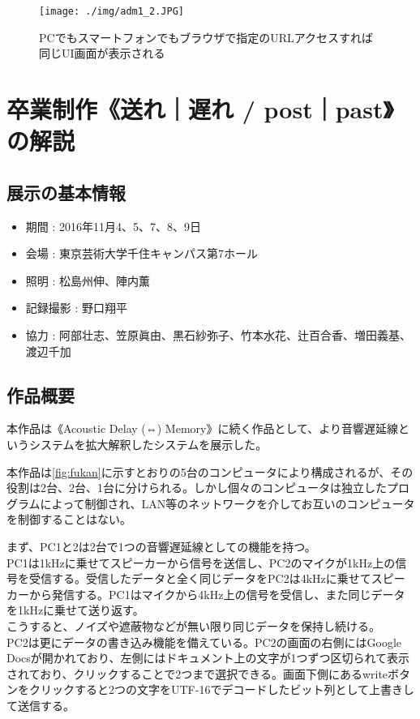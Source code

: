 \documentclass[a4paper,report]{jsbook}
\begin{document}
\begin{no-prefix-figure-caption}

\begin{figure}[htbp]
\centering
\texttt{[image: ./img/adm1\_2.JPG]}
\caption{PCでもスマートフォンでもブラウザで指定のURLアクセスすれば同じUI画面が表示される}
\end{figure}

\end{no-prefix-figure-caption}

\section{卒業制作《送れ｜遅れ /
post｜past》の解説}\label{ux5352ux696dux5236ux4f5cux9001ux308cux9045ux308c-postpastux306eux89e3ux8aac}

\subsection{展示の基本情報}\label{ux5c55ux793aux306eux57faux672cux60c5ux5831-1}

\begin{itemize}
\tightlist
\item
  期間 : 2016年11月4、5、7、8、9日
\item
  会場 : 東京芸術大学千住キャンパス第7ホール
\item
  照明 : 松島州伸、陣内薫
\item
  記録撮影 : 野口翔平
\item
  協力 :
  阿部壮志、笠原眞由、黒石紗弥子、竹本水花、辻百合香、増田義基、渡辺千加
\end{itemize}

\subsection{作品概要}\label{ux4f5cux54c1ux6982ux8981-2}

本作品は《Acoustic Delay (⇔)
Memory》に続く作品として、より音響遅延線というシステムを拡大解釈したシステムを展示した。

本作品は\cref{fig:fukan}に示すとおりの5台のコンピュータにより構成されるが、その役割は2台、2台、1台に分けられる。しかし個々のコンピュータは独立したプログラムによって制御され、LAN等のネットワークを介してお互いのコンピュータを制御することはない。

まず、PC1と2は2台で1つの音響遅延線としての機能を持つ。\\
PC1は1kHzに乗せてスピーカーから信号を送信し、PC2のマイクが1kHz上の信号を受信する。受信したデータと全く同じデータをPC2は4kHzに乗せてスピーカーから発信する。PC1はマイクから4kHz上の信号を受信し、また同じデータを1kHzに乗せて送り返す。\\
こうすると、ノイズや遮蔽物などが無い限り同じデータを保持し続ける。\\
PC2は更にデータの書き込み機能を備えている。PC2の画面の右側にはGoogle
Docsが開かれており、左側にはドキュメント上の文字が1つずつ区切られて表示されており、クリックすることで2つまで選択できる。画面下側にあるwriteボタンをクリックすると2つの文字をUTF-16でデコードしたビット列として上書きして送信する。
\end{document}
